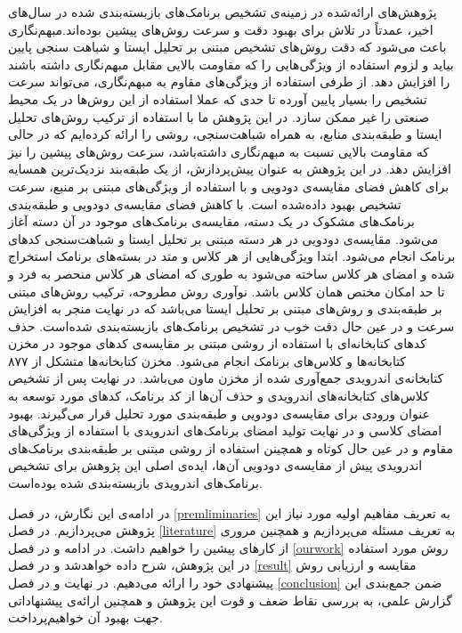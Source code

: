 پژوهش‌های ارائه‌شده در زمینه‌ی تشخیص برنامک‌های بازبسته‌بندی شده در سال‌های اخیر، عمدتاً در تلاش برای بهبود دقت و سرعت روش‌های پیشین بوده‌اند.مبهم‌نگاری باعث می‌شود که دقت روش‌های تشخیص مبتنی بر تحلیل ایستا و شباهت سنجی پایین بیاید و لزوم استفاده از ویژگی‌هایی را که مقاومت بالایی مقابل مبهم‌نگاری داشته باشند را افزایش دهد. از طرفی استفاده از ویزگی‌های مقاوم به مبهم‌نگاری، می‌تواند سرعت تشخیص را بسیار پایین آورده تا حدی که عملا استفاده از این روش‌ها در یک محیط صنعتی را غیر ممکن سازد. در این پژوهش ما با استفاده از ترکیب روش‌های تحلیل ایستا و طبقه‌بندی منابع، به همراه شباهت‌سنجی، روشی را ارائه‌ کرده‌ایم که در حالی که مقاومت بالایی نسبت به مبهم‌نگاری داشته‌باشد، سرعت روش‌های پیشین را نیز افزایش دهد. در این پژوهش به عنوان پیش‌پردازش، از یک طبقه‌بند نزدیک‌ترین همسایه برای کاهش فضای مقایسه‌ی دودویی و با استفاده از ویژگی‌های مبتنی بر منبع، سرعت تشخیص بهبود داده‌شده است. با کاهش فضای مقایسه‌ی دودویی و طبقه‌بندی برنامک‌های مشکوک در یک دسته، مقایسه‌ی برنامک‌های موجود در آن دسته آغاز می‌شود. مقایسه‌ی دودویی در هر دسته مبتنی بر تحلیل ایستا و شباهت‌سنجی کد‌های برنامک انجام می‌شود. ابتدا ویژگی‌هایی از هر کلاس و متد در بسته‌های برنامک استخراج شده و امضای هر کلاس ساخته می‌شود به طوری که امضای هر کلاس منحصر به فرد و تا حد امکان مختص همان کلاس باشد. نوآوری روش مطروحه، ترکیب روش‌های مبتنی بر طبقه‌بندی و روش‌های مبتنی بر تحلیل ایستا می‌باشد که در نهایت منجر به افزایش سرعت و در عین حال دقت خوب در تشخیص برنامک‌های بازبسته‌بندی شده‌است. حذف کد‌های کتابخانه‌ای با استفاده از روشی مبتنی بر مقایسه‌ی کد‌های موجود در مخزن کتابخانه‌ها و کلاس‌های برنامک انجام می‌شود. مخزن کتابخانه‌ها متشکل از ۸۷۷ کتابخانه‌ی اندرویدی جمع‌آوری شده‌ از مخزن ماون می‌باشد.  در نهایت پس از تشخیص کلاس‌های کتابخانه‌های اندرویدی و حذف آن‌ها از کد برنامک، کد‌های مورد توسعه به عنوان ورودی برای مقایسه‌ی دودویی و طبقه‌بندی مورد تحلیل قرار می‌گیرند. بهبود امضای کلاسی و در نهایت تولید امضای برنامک‌های اندرویدی با استفاده از ویژگی‌های مقاوم و در عین حال کوتاه و همچینن استفاده از روشی مبتنی بر طبقه‌بندی برنامک‌های اندرویدی پیش از مقایسه‌ی دودویی آن‌ها، ایده‌ی اصلی این پژوهش برای تشخیص برنامک‌های اندرویدی بازبسته‌بندی شده بوده‌است.

در ادامه‌ی این نگارش،  در فصل
\ref{premliminaries}
به تعریف مفاهیم اولیه مورد نیاز این پژوهش می‌پردازیم. در فصل
\ref{literature}
به تعریف مسئله می‌پردازیم و همچنین مروری از کار‌های پیشین را خواهیم داشت.
در ادامه و در فصل
\ref{ourwork}
 روش مورد استفاده در این پژوهش، شرح داده خواهد‌شد  و در فصل
\ref{result}
مقایسه و ارزیابی روش پیشنهادی خود‌ را ارائه می‌دهیم. در نهایت و در فصل
\ref{conclusion}
ضمن جمع‌بندی این گزارش علمی، به بررسی نقاط ضعف و قوت این پژوهش و همچنین ارائه‌ی پیشنهاداتی جهت بهبود آن خواهیم‌پرداخت.


